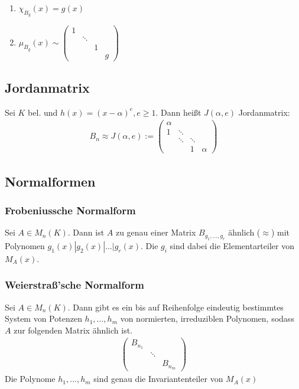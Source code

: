 \begin{remark}
\leavevmode
\begin{enumerate}
	\item $\chi_{B_g}(x) = g(x)$
	\item $\mu_{B_g}(x) \sim 
	\begin{pmatrix}
		1 &        & & \\
		  & \ddots & & \\
		  &        &1& \\
		  &        & & g
	\end{pmatrix}$
\end{enumerate}
\end{remark}


\subsection{Jordanmatrix}
\begin{definition}
Sei $K$ bel. und $h(x)=(x-\alpha)^e, e \geq 1$. Dann heißt $J(\alpha,e)$ Jordanmatrix:
\begin{align*}
B_n \approx J(\alpha,e) :=
\begin{pmatrix}
\alpha &        &   &\\
1      & \ddots &   &\\
       & \ddots & \ddots &\\
       &        & 1 & \alpha
\end{pmatrix}
\end{align*}
\end{definition}

\subsection{Normalformen}
\subsubsection{Frobeniussche Normalform}
\begin{theorem}
Sei $A \in M_n(K)$. Dann ist $A$ zu genau einer Matrix $B_{g_1,...,g_r}$ ähnlich ($\approx$) mit Polynomen $g_1(x) | g_2(x)| ... | g_r(x)$. Die $g_i$ sind dabei die Elementarteiler von $M_A(x)$.
\end{theorem}
\subsubsection{Weierstraß'sche Normalform}
\begin{theorem}
Sei $A \in M_n(K)$. Dann gibt es ein bis auf Reihenfolge eindeutig bestimmtes System von Potenzen $h_1,...,h_m$ von normierten, irreduziblen Polynomen, sodass $A$ zur folgenden Matrix ähnlich ist.
\begin{align*}
\begin{pmatrix}
B_{n_1} &        & \\
        & \ddots & \\
        &		  & B_{n_m}
\end{pmatrix}
\end{align*}
Die Polynome $h_1,...,h_m$ sind genau die Invariantenteiler von $M_A(x)$
\end{theorem}

